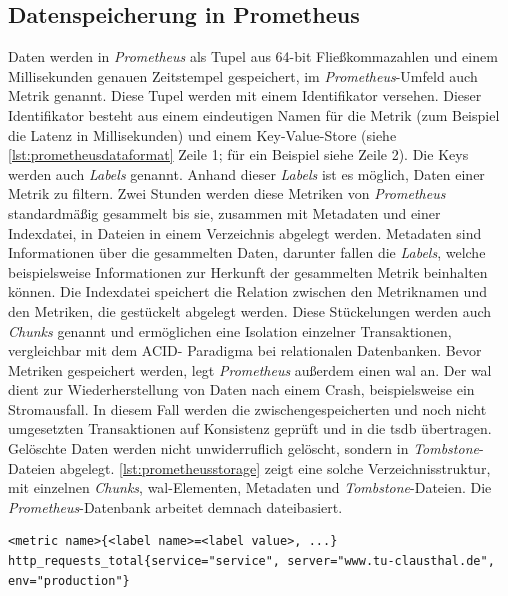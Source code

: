 \documentclass[titlepage]{report}
\begin{document}
\subsection*{Datenspeicherung in Prometheus}
Daten werden in \emph{Prometheus} als Tupel aus 64\hyp{}bit
Fließkommazahlen und einem Millisekunden genauen Zeitstempel
gespeichert\cite{PROMETHEUS_DATA_MODEL}, im
\emph{Prometheus}\hyp{}Umfeld auch Metrik genannt. Diese Tupel werden
mit einem Identifikator versehen. Dieser Identifikator besteht aus einem
eindeutigen Namen für die Metrik (zum Beispiel die Latenz in
Millisekunden) und einem Key\hyp{}Value\hyp{}Store (siehe
\autoref{lst:prometheusdataformat} Zeile 1; für ein Beispiel siehe Zeile
2). Die Keys werden auch \emph{Labels} genannt. Anhand dieser
\emph{Labels} ist es möglich, Daten einer Metrik zu filtern. Zwei
Stunden werden diese Metriken von \emph{Prometheus} standardmäßig
gesammelt bis sie, zusammen mit Metadaten und einer Indexdatei, in
Dateien in einem Verzeichnis abgelegt werden. Metadaten sind
Informationen über die gesammelten Daten, darunter fallen die
\emph{Labels}, welche beispielsweise Informationen zur Herkunft der
gesammelten Metrik beinhalten können. Die Indexdatei speichert die
Relation zwischen den Metriknamen und den Metriken, die gestückelt
abgelegt werden. Diese Stückelungen werden auch \emph{Chunks}
genannt\cite{PROMETHEUS_STORAGE} und ermöglichen eine Isolation
einzelner Transaktionen, vergleichbar mit dem ACID\hyp{} Paradigma bei
relationalen Datenbanken. Bevor Metriken gespeichert werden, legt
\emph{Prometheus} außerdem einen \gls{wal} an. Der \gls{wal} dient zur
Wiederherstellung von Daten nach einem Crash, beispielsweise ein
Stromausfall. In diesem Fall werden die zwischengespeicherten und noch
nicht umgesetzten Transaktionen auf Konsistenz geprüft und in die
\gls{tsdb} übertragen.  Gelöschte Daten werden nicht unwiderruflich
gelöscht, sondern in \emph{Tombstone}\hyp{}Dateien abgelegt.
\autoref{lst:prometheusstorage} zeigt eine solche Verzeichnisstruktur,
mit einzelnen \emph{Chunks}, \gls{wal}\hyp{}Elementen, Metadaten und
\emph{Tombstone}\hyp{}Dateien. Die \emph{Prometheus}\hyp{}Datenbank
arbeitet demnach dateibasiert.
\begin{minipage}{\linewidth}
\begin{lstlisting}[caption={Prometheus Datenformat und
Beispiel},label={lst:prometheusdataformat}]
<metric name>{<label name>=<label value>, ...}
http_requests_total{service="service", server="www.tu-clausthal.de", env="production"}
\end{lstlisting}
\end{minipage}
\end{document}
